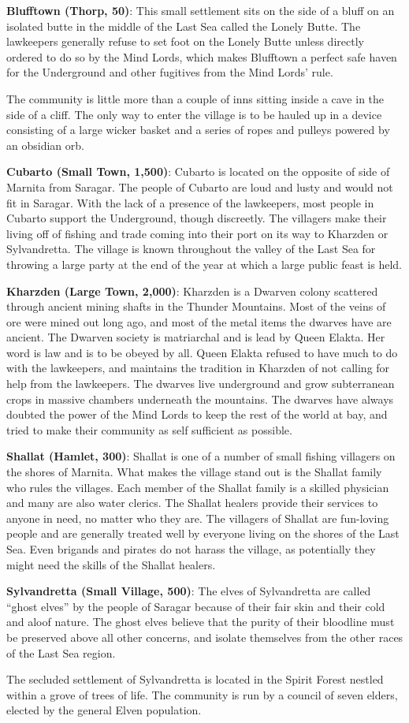 {
	\textbf{Blufftown (Thorp, 50)}: This small settlement sits on the side of a bluff on an isolated butte in the middle of the Last Sea called the Lonely Butte. The lawkeepers generally refuse to set foot on the Lonely Butte unless directly ordered to do so by the Mind Lords, which makes Blufftown a perfect safe haven for the Underground and other fugitives from the Mind Lords' rule.

	The community is little more than a couple of inns sitting inside a cave in the side of a cliff. The only way to enter the village is to be hauled up in a device consisting of a large wicker basket and a series of ropes and pulleys powered by an obsidian orb.

	\textbf{Cubarto (Small Town, 1,500)}: Cubarto is located on the opposite of side of Marnita from Saragar. The people of Cubarto are loud and lusty and would not fit in Saragar. With the lack of a presence of the lawkeepers, most people in Cubarto support the Underground, though discreetly. The villagers make their living off of fishing and trade coming into their port on its way to Kharzden or Sylvandretta. The village is known throughout the valley of the Last Sea for throwing a large party at the end of the year at which a large public feast is held.

	\textbf{Kharzden (Large Town, 2,000)}: Kharzden is a Dwarven colony scattered through ancient mining shafts in the Thunder Mountains. Most of the veins of ore were mined out long ago, and most of the metal items the dwarves have are ancient. The Dwarven society is matriarchal and is lead by Queen Elakta. Her word is law and is to be obeyed by all. Queen Elakta refused to have much to do with the lawkeepers, and maintains the tradition in Kharzden of not calling for help from the lawkeepers. The dwarves live underground and grow subterranean crops in massive chambers underneath the mountains. The dwarves have always doubted the power of the Mind Lords to keep the rest of the world at bay, and tried to make their community as self sufficient as possible.

	\textbf{Shallat (Hamlet, 300)}: Shallat is one of a number of small fishing villagers on the shores of Marnita. What makes the village stand out is the Shallat family who rules the villages. Each member of the Shallat family is a skilled physician and many are also water clerics. The Shallat healers provide their services to anyone in need, no matter who they are. The villagers of Shallat are fun-loving people and are generally treated well by everyone living on the shores of the Last Sea. Even brigands and pirates do not harass the village, as potentially they might need the skills of the Shallat healers.

	\textbf{Sylvandretta (Small Village, 500)}: The elves of Sylvandretta are called ``ghost elves'' by the people of Saragar because of their fair skin and their cold and aloof nature. The ghost elves believe that the purity of their bloodline must be preserved above all other concerns, and isolate themselves from the other races of the Last Sea region.

	The secluded settlement of Sylvandretta is located in the Spirit Forest nestled within a grove of trees of life. The community is run by a council of seven elders, elected by the general Elven population.
}
